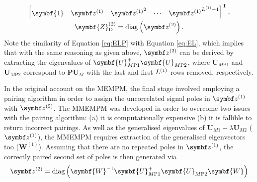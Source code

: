 {\begin{subequations}
\begin{gather}
\begin{bmatrix}
            \symbf{1} &
            \bdzone &
            {\bdzone}^2 &
            \cdots &
            {\bdzone}^{\Lone-1}
        \end{bmatrix}\T,\\
        \symbf{Z}^{(2)}_{\text{D}} = \diag \left( \bdztwo \right).
    \end{gather}
\end{subequations}
Note the similarity of Equation \ref{eq:ELP} with Equation \ref{eq:EL}, which
implies that with the same reasoning as given above, $\bdztwo$ can be derived
by extracting the eigenvalues of $\symbf{U}_{M\text{P}1}^+
\symbf{U}_{M\text{P}2}^{\vphantom{+}}$, where $\symbf{U}_{M\text{P}1}$ and
$\symbf{U}_{M\text{P}2}$ correspond to $\symbf{P} \symbf{U}_M$
with the last and first $L^{(1)}$ rows removed, respectively.

In the original account on the \ac{MEMPM}, the final stage involved employing a
pairing algorithm in order to assign the uncorrelated signal poles in $\bdzone$
with $\bdztwo$\cite{Hua1992}. The \ac{MMEMPM} was developed in order to
overcome two issues with the pairing algorithm: (a) it is computationally
expensive (b) it is fallible to return incorrect pairings\cite{Chen2007}.
As well as the generalised eigenvalues of $\symbf{U}_{M1} - \lambda
\symbf{U}_{M2}$ ($\bdzone$), the \ac{MMEMPM} requires extraction of the
generalised eigenvectors too ($\symbf{W}^{(1)}$). Assuming that there are no
repeated poles in $\bdzone$, the correctly paired second set of poles is then
generated via
\begin{equation}
    \bdztwo = \diag\left(
        \symbf{W}^{-1}
        \symbf{U}_{M\text{P}1}^+
        \symbf{U}_{M\text{P}2}^{\vphantom{+}}
        \symbf{W}
    \right)
\end{equation}

}

